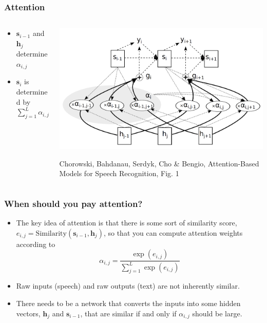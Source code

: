 \documentclass{beamer}
\begin{document}
\begin{frame}
  \frametitle{Attention}
  \begin{columns}
    \begin{column}{0.3\textwidth}
      \begin{itemize}
      \item $\bm{s}_{i-1}$ and $\bm{h}_j$ determine $\alpha_{i,j}$
      \item $\bm{s}_i$ is determined by $\sum_{j=1}^L \alpha_{i,j}\bm{h}_j$
      \end{itemize}
    \end{column}
    \begin{column}{0.7\textwidth}
      \begin{center}
        \includegraphics[width=\textwidth]{figs/chorowski2014fig1.png}

        \begin{tiny}
          Chorowski, Bahdanau, Serdyk, Cho \& Bengio, Attention-Based
          Models for Speech Recognition, Fig. 1
        \end{tiny}
      \end{center}
    \end{column}
  \end{columns}
\end{frame}

\begin{frame}
  \frametitle{When should you pay attention?}

  \begin{itemize}
    \item 
      The key idea of attention is that there is some sort of similarity
      score, $e_{i,j}=\mbox{Similarity}(\bm{s}_{i-1},\bm{h}_j)$, so that you can
      compute attention weights according to
      \begin{displaymath}
        \alpha_{i,j} = \frac{\exp(e_{i,j})}{\sum_{j=1}^L \exp(e_{i,j})}
      \end{displaymath}
    \item
      Raw inputs (speech) and raw outputs (text) are not inherently
      similar.
    \item
      There needs to be a network that converts the inputs into
      some hidden vectors, $\bm{h}_j$ and $\bm{s}_{i-1}$, that are similar if
      and only if $\alpha_{i,j}$ should be large.
  \end{itemize}
\end{frame}
\end{document}
